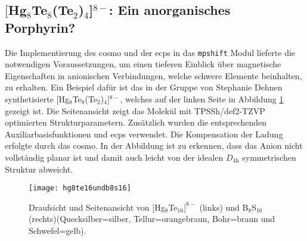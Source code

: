 \FloatBarrier
\newpage

\subsection{\texorpdfstring{$[$Hg$_8$Te$_8$(Te$_2$)$_4$]$^{8-}$}{[Hg\_8Te\_8(Te\_2)\_4]\^8-}: Ein anorganisches Porphyrin?}
Die Implementierung des \ac{cosmo}\supercite{klamt1993cosmo} und der \acp{ecp} in das \texttt{mpshift} Modul lieferte die notwendigen Voraussetzungen, um einen tieferen Einblick über magnetische Eigenschaften in anionischen Verbindungen, welche schwere Elemente beinhalten, zu erhalten. Ein Beispiel dafür ist das in der Gruppe von Stephanie Dehnen synthetisierte $[$Hg$_8$Te$_8$(Te$_2$)$_4$]$^{8-}$\supercite{dehnenhg4te8}, welches auf der linken Seite in Abbildung \ref{abb:hg8te16undb8s16} gezeigt ist. Die Seitenansicht zeigt das Molekül mit TPSSh\supercite{tao2003climbing}/def2-TZVP\supercite{weigend2005balanced} optimierten Strukturparametern. Zusätzlich wurden die entsprechenden Auxiliarbasisfunktionen\supercite{weigend2006accurate} und \acp{ecp}\supercite{peterson2003systematically} verwendet. Die Kompensation der Ladung erfolgte durch das \ac{cosmo}. In der Abbildung ist zu erkennen, dass das Anion nicht vollständig planar ist und damit auch leicht von der idealen $D_{4\textrm{h}}$ symmetrischen Struktur abweicht. 
\begin{figure}[ht!]
	\centering
	\texttt{[image: hg8te16undb8s16]}
	\captionsetup{figurewithin = chapter}
	\captionsetup{font=small, labelfont=bf}\caption[{Abbildung von $[$Hg$_8$Te$_{16}]^{8-}$ und B$_8$S$_{16}$}]{{Draufsicht und Seitenansicht von $[$Hg$_8$Te$_{16}]^{8-}$} (links) und B$_8$S$_{16}$ (rechts)(Quecksilber=silber, Tellur=orangebraun, Bohr=braun und Schwefel=gelb).}
\label{abb:hg8te16undb8s16}
\end{figure}


